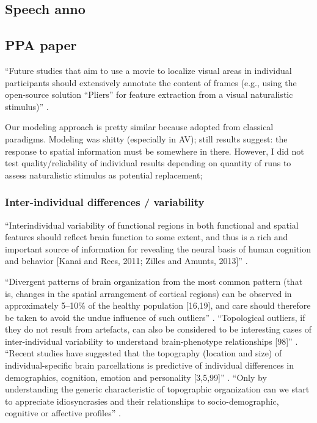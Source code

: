\subsection{Speech anno}



\subsection{PPA paper}




%
``Future studies that aim to use a movie to localize visual areas in individual
participants should extensively annotate the content of frames (e.g., using the
open-source solution ``Pliers''\citep{mcnamara2017developing} for feature
extraction from a visual naturalistic stimulus)''
\citep{haeusler2022processing}.

%
Our modeling approach is pretty similar because adopted from classical
paradigms.
%
Modeling was shitty (especially in AV);
%
still results suggest: the response to spatial information must be somewhere in
there.
%
However, I did not test quality/reliability of individual results depending on
quantity of runs to assess naturalistic stimulus as potential replacement;


\subsubsection{Inter-individual differences / variability}

%
``Interindividual variability of functional regions in both functional and
spatial features should reflect brain function to some extent, and thus is a
rich and important source of information for revealing the neural basis of human
cognition and behavior [Kanai and Rees, 2011; Zilles and Amunts, 2013]''
\citep{zhen2015quantifying}.

%
``Divergent patterns of brain organization from the most common pattern (that
is, changes in the spatial arrangement of cortical regions) can be observed in
approximately 5–10\% of the healthy population [16,19], and care should
therefore be taken to avoid the undue influence of such outliers''
\citep{eickhoff2018imaging}.
%
``Topological outliers, if they do not result from artefacts, can also be
considered to be interesting cases of inter-individual variability to understand
brain-phenotype relationships [98]'' \citep{eickhoff2018imaging}.
%
``Recent studies have suggested that the topography (location and size)
of individual-specific brain parcellations is predictive of individual
differences in demographics, cognition, emotion and personality [3,5,99]''
\citep{eickhoff2018imaging}.
%
``Only by understanding the generic characteristic of topographic organization
can we start to appreciate idiosyncrasies and their relationships to
socio-demographic, cognitive or affective profiles''
\citep{eickhoff2018imaging}.

